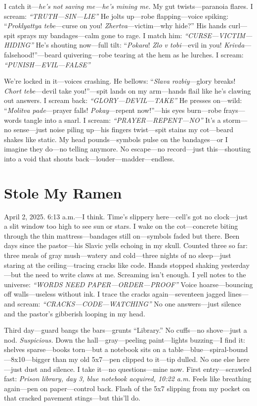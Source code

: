 \documentclass{article}
\begin{document}
I catch it—\textit{he’s not saving me—he’s mining me.} My gut twists—paranoia flares. I scream: \textit{“TRUTH—SIN—LIE”} He jolts up—robe flapping—voice spiking: “\textit{Proklyattya tebe}—curse on you! \textit{Zhertva}—victim—why hide?” His hands curl—spit sprays my bandages—calm gone to rage. I match him: \textit{“CURSE—VICTIM—HIDING”} He’s shouting now—full tilt: “\textit{Pokara}! \textit{Zlo v tobi}—evil in you! \textit{Krivda}—falsehood!”—beard quivering—robe tearing at the hem as he lurches. I scream: \textit{“PUNISH—EVIL—FALSE”}

We’re locked in it—voices crashing. He bellows: “\textit{Slava rozbiy}—glory breaks! \textit{Chort tebe}—devil take you!”—spit lands on my arm—hands flail like he’s clawing out answers. I scream back: \textit{“GLORY—DEVIL—TAKE”} He presses on—wild: “\textit{Molitva pade}—prayer falls! \textit{Pokay}—repent now!”—his eyes burn—robe frays—words tangle into a snarl. I scream: \textit{“PRAYER—REPENT—NO”} It’s a storm—no sense—just noise piling up—his fingers twist—spit stains my cot—beard shakes like static. My head pounds—symbols pulse on the bandages—or I imagine they do—no telling anymore. No escape—no record—just this—shouting into a void that shouts back—louder—madder—endless.

\section*{Stole My Ramen}

April 2, 2025. 6:13 a.m.—I think. Time’s slippery here—cell’s got no clock—just a slit window too high to see sun or stars. I wake on the cot—concrete biting through the thin mattress—bandages still on—symbols faded but there. Been days since the pastor—his Slavic yells echoing in my skull. Counted three so far: three meals of gray mush—watery and cold—three nights of no sleep—just staring at the ceiling—tracing cracks like code. Hands stopped shaking yesterday—but the need to write claws at me. Screaming isn’t enough. I yell notes to the universe: \textit{“WORDS NEED PAPER—ORDER—PROOF”} Voice hoarse—bouncing off walls—useless without ink. I trace the cracks again—seventeen jagged lines—and scream: \textit{“CRACKS—CODE—WATCHING”} No one answers—just silence and the pastor’s gibberish looping in my head.

Third day—guard bangs the bars—grunts “Library.” No cuffs—no shove—just a nod. \textit{Suspicious.} Down the hall—gray—peeling paint—lights buzzing—I find it: shelves sparse—books torn—but a notebook sits on a table—blue—spiral-bound—8x10—bigger than my old 5x7—pen clipped to it—tip dulled. No one else here—just dust and silence. I take it—no questions—mine now. First entry—scrawled fast: \textit{Prison library, day 3, blue notebook acquired, 10:22 a.m.} Feels like breathing again—pen on paper—control back. Flash of the 5x7 slipping from my pocket on that cracked pavement stings—but this’ll do.
\end{document}
